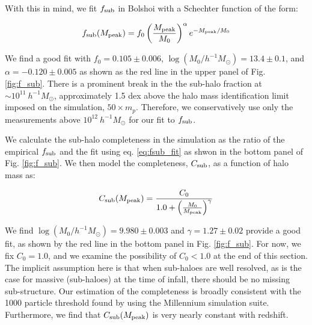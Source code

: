 \documentclass[a4paper,fleqn,usenatbib]{mnras}
\begin{document}
With this in mind, we fit $f_{\rm sub}$ in Bolshoi with a Schechter function of the form:
%
\begin{linenomath}
\begin{equation}
\label{eq:fsub_fit}
f_{\rm sub}(M_{\rm peak}) = f_0 \left( \frac{M_{\rm peak}}{M_0} \right)^{\alpha}e^{-M_{\rm peak}/M_0}
\end{equation}
\end{linenomath}
%
We find a good fit with $f_0 = 0.105 \pm 0.006$, $\log(M_0/h^{-1}M_{\odot}) = 13.4 \pm 0.1$, and $\alpha = -0.120 \pm 0.005$ as shown as the red line in the upper panel of Fig. \ref{fig:f_sub}.  There is a prominent break in the the sub-halo fraction at $\sim 10^{11} ~ h^{-1}M_{\odot}$, approximately 1.5 dex above the halo mass identification limit imposed on the simulation, $50 \times m_{p}$.  Therefore, we conservatively use only the measurements above $10^{12}~h^{-1}M_{\odot}$ for our fit to $f_{\rm sub}$.  

We calculate the sub-halo completeness in the simulation as the ratio of the empirical $f_{\rm sub}$ and the fit using eq. \ref{eq:fsub_fit} as shwon in the bottom panel of Fig. \ref{fig:f_sub}.  We then model the completeness, $C_{\rm sub}$, as a function of halo mass as:
%
\begin{linenomath}
\begin{equation}
\label{eq:sub_completeness}
C_{\rm sub}(M_{\rm peak}) = \frac{C_0}{1.0 + \left(\frac{M_0}{M_{\rm peak}}\right)^{\gamma}}
\end{equation}
\end{linenomath}
%
We find $\log(M_0/h^{-1}M_{\odot})=9.980\pm0.003$ and $\gamma=1.27 \pm 0.02$ provide a good fit, as shown by the red line in the bottom panel in Fig. \ref{fig:f_sub}.  For now, we fix $C_0=1.0$, and we examine the possibility of $C_0<1.0$ at the end of this section.  The implicit assumption here is that when sub-haloes are well resolved, as is the case for massive (sub-haloes) at the time of infall, there should be no missing sub-structure.  Our estimation of the completeness is broadly consistent with the 1000 particle threshold found by \citet{Guo:2013fm} using the Millennium simulation suite.  Furthermore, we find that $C_{\rm sub}(M_{\rm peak})$ is very nearly constant with redshift.  
\end{document}
